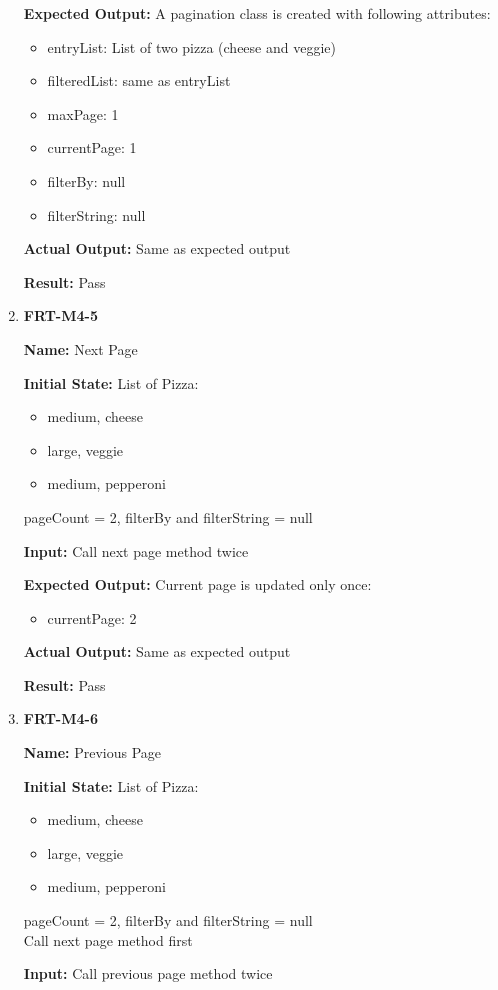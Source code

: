 \documentclass[12pt, titlepage]{article}
\begin{document}
\begin{enumerate}
\textbf{Expected Output:} A pagination class is created with following attributes:
\begin{itemize}
\item entryList: List of two pizza (cheese and veggie)
\item filteredList: same as entryList
\item maxPage: 1
\item currentPage: 1
\item filterBy: null
\item filterString: null
\end{itemize}

\textbf{Actual Output:} Same as expected output

\textbf{Result:} Pass

\item \textbf{FRT-M4-5}

\textbf{Name:} Next Page

\textbf{Initial State:} List of Pizza:
\begin{itemize}
\item medium, cheese
\item large, veggie
\item medium, pepperoni
\end{itemize}
pageCount = 2, filterBy and filterString = null
					
\textbf{Input:} Call next page method twice
					
\textbf{Expected Output:} Current page is updated only once:
\begin{itemize}
\item currentPage: 2
\end{itemize}

\textbf{Actual Output:} Same as expected output

\textbf{Result:} Pass

\item \textbf{FRT-M4-6}

\textbf{Name:} Previous Page

\textbf{Initial State:} List of Pizza:
\begin{itemize}
\item medium, cheese
\item large, veggie
\item medium, pepperoni
\end{itemize}
pageCount = 2, filterBy and filterString = null\\
Call next page method first
					
\textbf{Input:} Call previous page method twice
					

\end{enumerate}
\end{document}
